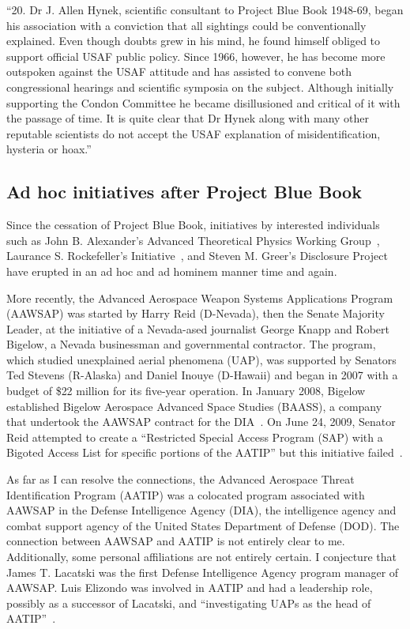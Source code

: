 \begin{svgraybox}
``20. Dr J. Allen Hynek, scientific consultant to Project Blue
Book 1948-69, began his association with a conviction that all
sightings could be conventionally explained. Even though doubts
grew in his mind, he found himself obliged to support official USAF
public policy. Since 1966, however, he has become more outspoken
against the USAF attitude and has assisted to convene both
congressional hearings and scientific symposia on the subject.
Although initially supporting the Condon Committee he became
disillusioned and critical of it with the passage of time. It is
quite clear that Dr Hynek along with many other reputable scientists
do not accept the USAF explanation of misidentification, hysteria or
hoax.''
\end{svgraybox}


\subsection{Ad hoc initiatives after Project Blue Book}
\label{2023-UFO-part-Perception-types-USA-ahpbbera}

Since the cessation of Project Blue Book, initiatives by interested individuals
such as John B. Alexander's Advanced Theoretical Physics Working Group~\cite{Alexander2023Jan,Omega_Point2022Nov},
Laurance S. Rockefeller's Initiative~\cite{Berliner2000Jun}, and Steven M. Greer's Disclosure Project~\cite{Greer-dp}
have erupted in an ad hoc and ad hominem manner time and again.

More recently, the Advanced Aerospace Weapon Systems Applications Program (AAWSAP) was started by Harry Reid (D-Nevada),
then the Senate Majority Leader, at the initiative of a Nevada-ased journalist George Knapp and Robert Bigelow, a Nevada businessman and governmental contractor. The program, which studied unexplained aerial phenomena (UAP), was supported by Senators Ted Stevens (R-Alaska) and Daniel Inouye (D-Hawaii) and began in 2007 with a budget of {\$}22 million for its five-year operation. In January 2008, Bigelow established Bigelow Aerospace Advanced Space Studies (BAASS), a company that undertook the AAWSAP contract for the DIA~\cite{Lacatski-2021}. On June 24, 2009, Senator Reid attempted to create a ``Restricted Special Access Program (SAP) with a Bigoted Access List for specific portions of the AATIP'' but this initiative failed~\cite{Lacatski-2021}.

As far as I can resolve the connections, the Advanced Aerospace Threat Identification Program (AATIP) was a colocated program associated with AAWSAP in the Defense Intelligence Agency (DIA), the intelligence agency and combat support agency of the United States Department of Defense (DOD). The connection between AAWSAP and AATIP is not entirely clear to me. Additionally, some personal affiliations are not entirely certain. I conjecture that James T. Lacatski was the first Defense Intelligence Agency program manager of AAWSAP. Luis Elizondo was involved in AATIP and had a leadership role, possibly as a successor of Lacatski, and ``investigating UAPs as the head of AATIP''~\cite{ReidLetterApril2021}.

